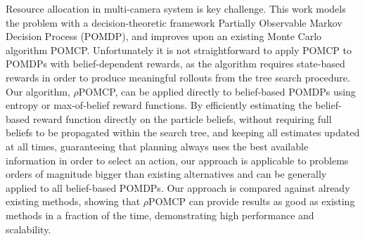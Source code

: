 Resource allocation in multi-camera system is key challenge. This work models the problem with a
decision-theoretic framework Partially Observable Markov Decision Process (POMDP), and improves upon
an existing Monte Carlo algorithm POMCP. Unfortunately it is not straightforward to apply POMCP to
POMDPs with belief-dependent rewards, as the algorithm requires state-based rewards in order to
produce meaningful rollouts from the tree search procedure. Our algorithm, $\rho$POMCP, can be
applied directly to belief-based POMDPs using entropy or max-of-belief reward functions. By
efficiently estimating the belief-based reward function directly on the particle beliefs, without
requiring full beliefs to be propagated within the search tree, and keeping all estimates updated at
all times, guaranteeing that planning always uses the best available information in order to select
an action, our approach is applicable to problems orders of magnitude bigger than existing
alternatives and can be generally applied to all belief-based POMDPs. Our approach is compared
against already existing methods, showing that $\rho$POMCP can provide results as good as existing
methods in a fraction of the time, demonstrating high performance and scalability.
